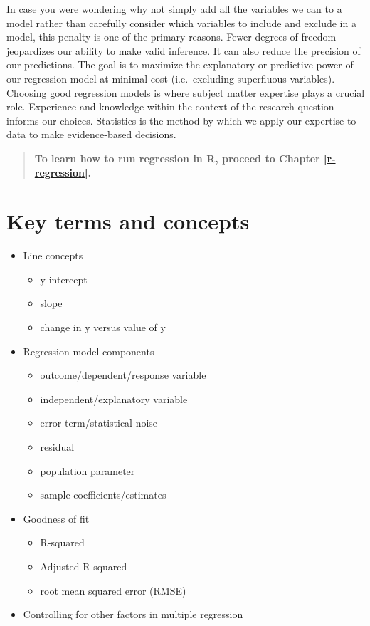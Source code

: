 \documentclass[
]{book}
\providecommand{\tightlist}{%
  \setlength{\itemsep}{0pt}\setlength{\parskip}{0pt}}
\begin{document}
In case you were wondering why not simply add all the variables we can to a model rather than carefully consider which variables to include and exclude in a model, this penalty is one of the primary reasons. Fewer degrees of freedom jeopardizes our ability to make valid inference. It can also reduce the precision of our predictions. The goal is to maximize the explanatory or predictive power of our regression model at minimal cost (i.e.~excluding superfluous variables). Choosing good regression models is where subject matter expertise plays a crucial role. Experience and knowledge within the context of the research question informs our choices. Statistics is the method by which we apply our expertise to data to make evidence-based decisions.

\begin{quote}
\textbf{To learn how to run regression in R, proceed to Chapter \ref{r-regression}.}
\end{quote}

\hypertarget{kt6}{%
\section{Key terms and concepts}\label{kt6}}

\begin{itemize}
\tightlist
\item
  Line concepts

  \begin{itemize}
  \tightlist
  \item
    y-intercept
  \item
    slope
  \item
    change in y versus value of y
  \end{itemize}
\item
  Regression model components

  \begin{itemize}
  \tightlist
  \item
    outcome/dependent/response variable
  \item
    independent/explanatory variable
  \item
    error term/statistical noise
  \item
    residual
  \item
    population parameter
  \item
    sample coefficients/estimates
  \end{itemize}
\item
  Goodness of fit

  \begin{itemize}
  \tightlist
  \item
    R-squared
  \item
    Adjusted R-squared
  \item
    root mean squared error (RMSE)
  \end{itemize}
\item
  Controlling for other factors in multiple regression
\end{itemize}
\end{document}

